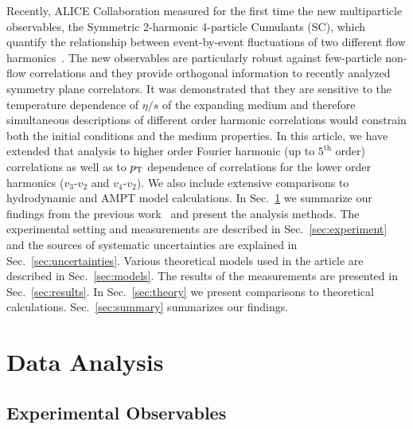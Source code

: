 Recently, ALICE Collaboration measured for the first time the new multiparticle observables, the Symmetric 2-harmonic 4-particle Cumulants (SC), which quantify the relationship between event-by-event fluctuations of two different flow harmonics~\cite{ALICE:2016kpq}. 
The new observables are particularly robust against few-particle non-flow correlations and they provide orthogonal information to recently analyzed symmetry plane correlators. 
It was demonstrated that they are sensitive to the temperature dependence of $\eta/s$ of the expanding medium and therefore simultaneous descriptions of different order harmonic correlations would constrain both the initial conditions and the medium properties.
In this article, we have extended that analysis to higher order Fourier harmonic (up to $5^{\mathrm{th}}$ order) correlations as well as to $p_{\rm T}$ dependence of correlations for the lower order harmonics ($v_3$-$v_2$ and $v_4$-$v_2$).  We also include extensive comparisons to hydrodynamic and AMPT model calculations.
In Sec.~\ref{sec:method} we summarize our findings from the previous work~\cite{ALICE:2016kpq} and present the analysis methods. The experimental setting and measurements are described in Sec.~\ref{sec:experiment} and the sources of systematic uncertainties are explained in Sec.~\ref{sec:uncertainties}. Various theoretical models used in the article are described in Sec.~\ref{sec:models}. The results of the measurements are presented in Sec.~\ref{sec:results}.
 In Sec.~\ref{sec:theory} we present comparisons to theoretical calculations. Sec.~\ref{sec:summary} summarizes our findings.
 
 
\section{Data Analysis}
\label{sec:method}
\subsection{Experimental Observables}

